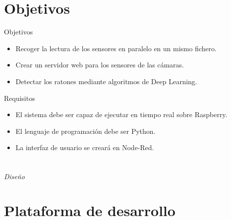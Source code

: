 \documentclass{beamer}
\begin{document}
\section{Objetivos}
\begin{frame}
\begin{block}{Objetivos}
\begin{itemize}
\item Recoger la lectura de los sensores en paralelo en un mismo fichero.
\item Crear un servidor web para los sensores de las cámaras.
\item Detectar los ratones mediante algoritmos de Deep Learning.
\end{itemize}
\end{block}

\begin{block}{Requisitos}
\begin{itemize}
\item El sistema debe ser capaz de ejecutar en tiempo real sobre Raspberry.
\item El lenguaje de programación debe ser Python.
\item La interfaz de usuario se creará en Node-Red.
\end{itemize}
\end{block}
\end{frame}

\section*{}
\begin{frame}{}
  \centering \Huge
  \emph{Diseño}
\end{frame}

\section{Plataforma de desarrollo}
\end{document}
